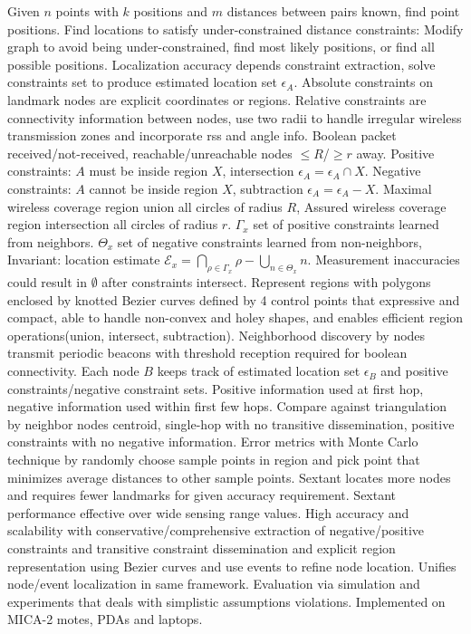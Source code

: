 \documentclass[9pt]{extarticle}
\begin{document}
\begin{multicols}{2}
Given $n$ points with $k$ positions and $m$ distances between pairs known, find point positions. Find locations to satisfy under-constrained distance constraints: Modify graph to avoid being under-constrained, find most likely positions, or find all possible positions. Localization accuracy depends constraint extraction, solve constraints set to produce estimated location set $\epsilon_A$. Absolute constraints on landmark nodes are explicit coordinates or regions. Relative constraints are connectivity information between nodes, use two radii to handle irregular wireless transmission zones and incorporate rss and angle info. Boolean packet received/not-received, reachable/unreachable nodes $\leq{R}$/$\geq{r}$ away. Positive constraints: $A$ must be inside region $X$, intersection $\epsilon_A = \epsilon_A\cap{X}$. Negative constraints: $A$ cannot be inside region $X$, subtraction $\epsilon_A = \epsilon_A-X$. Maximal wireless coverage region union all circles of radius $R$, Assured wireless coverage region intersection all circles of radius $r$. $\Gamma_x$ set of positive constraints learned from neighbors. $\Theta_x$ set of negative constraints learned from non-neighbors, Invariant: location estimate $\mathcal{E}_x= \bigcap_{\rho\in\Gamma_x}\rho-\bigcup_{n\in\Theta_x}n$. Measurement inaccuracies could result in $\emptyset$ after constraints intersect. Represent regions with polygons enclosed by knotted Bezier curves defined by 4 control points that expressive and compact, able to handle non-convex and holey shapes, and enables efficient region operations(union, intersect, subtraction). Neighborhood discovery by nodes transmit periodic beacons with threshold reception required for boolean connectivity. Each node $B$ keeps track of estimated location set $\epsilon_B$ and positive constraints/negative constraint sets.  Positive information used at first hop, negative information used within first few hops. Compare against triangulation by neighbor nodes centroid, single-hop with no transitive dissemination, positive constraints with no negative information. Error metrics with Monte Carlo technique by randomly choose sample points in region and pick point that minimizes average distances to other sample points. Sextant locates more nodes and requires fewer landmarks for given accuracy requirement. Sextant performance effective over wide sensing range values. High accuracy and scalability with conservative/comprehensive extraction of negative/positive constraints and transitive constraint dissemination and explicit region representation using Bezier curves and use events to refine node location. Unifies node/event localization in same framework. Evaluation via simulation and experiments that deals with simplistic assumptions violations. Implemented on MICA-2 motes, PDAs and laptops.


\end{multicols}
\end{document}
